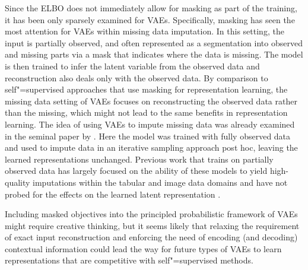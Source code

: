 Since the ELBO does not immediately allow for masking as part of the training, it has been only sparsely examined for VAEs. Specifically, masking has seen the most attention for VAEs within missing data imputation. In this setting, the input is partially observed, and often represented as a segmentation into observed and missing parts via a mask that indicates where the data is missing. The model is then trained to infer the latent variable from the observed data and reconstruction also deals only with the observed data. 
By comparison to self"=supervised approaches that use masking for representation learning, the missing data setting of VAEs focuses on reconstructing the observed data rather than the missing, which might not lead to the same benefits in representation learning. 
The idea of using VAEs to impute missing data was already examined in the seminal paper by \textcite{rezende_stochastic_2014}. Here the model was trained with fully observed data and used to impute data in an iterative sampling approach post hoc, leaving the learned representations unchanged.
Previous work that trains on partially observed data has largely focused on the ability of these models to yield high-quality imputations within the tabular and image data domains and have not probed for the effects on the learned latent representation \parencite{mattei_miwae_2019, ipsen_not-miwae_2021}. 

Including masked objectives into the principled probabilistic framework of VAEs might require creative thinking, but it seems likely that relaxing the requirement of exact input reconstruction and enforcing the need of encoding (and decoding) contextual information could lead the way for future types of VAEs to learn representations that are competitive with self"=supervised methods.












